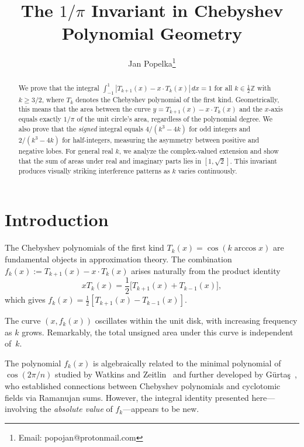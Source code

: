 \documentclass[11pt]{article}
\title{The $1/\pi$ Invariant in Chebyshev Polynomial Geometry}
\author{Jan Popelka\thanks{Email: popojan@protonmail.com}}
\date{}
\begin{document}
\maketitle

\begin{abstract}
We prove that the integral $\int_{-1}^{1} |T_{k+1}(x) - x \cdot T_k(x)| \, dx = 1$
for all $k \in \tfrac{1}{2}\mathbb{Z}$ with $k \geq 3/2$, where $T_k$ denotes the
Chebyshev polynomial of the first kind. Geometrically, this means that the area
between the curve $y = T_{k+1}(x) - x \cdot T_k(x)$ and the $x$-axis equals exactly
$1/\pi$ of the unit circle's area, regardless of the polynomial degree. We also
prove that the \emph{signed} integral equals $4/(k^3-4k)$ for odd integers and
$2/(k^3-4k)$ for half-integers, measuring the asymmetry between positive and
negative lobes. For general real $k$, we analyze the complex-valued extension
and show that the sum of areas under real and imaginary parts lies in $[1, \sqrt{2}]$.
This invariant produces visually striking interference patterns as $k$ varies continuously.
\end{abstract}

\section{Introduction}

The Chebyshev polynomials of the first kind $T_k(x) = \cos(k \arccos x)$ are
fundamental objects in approximation theory. The combination
$f_k(x) := T_{k+1}(x) - x \cdot T_k(x)$ arises naturally from the product identity
\cite{mason}
\begin{equation}
x T_k(x) = \frac{1}{2}\bigl[T_{k+1}(x) + T_{k-1}(x)\bigr],
\end{equation}
which gives $f_k(x) = \frac{1}{2}[T_{k+1}(x) - T_{k-1}(x)]$.

The curve $(x, f_k(x))$ oscillates within the unit disk, with increasing frequency
as $k$ grows. Remarkably, the total unsigned area under this curve is independent
of~$k$.

The polynomial $f_k(x)$ is algebraically related to the minimal polynomial of
$\cos(2\pi/n)$ studied by Watkins and Zeitlin~\cite{watkins1993} and further developed
by G\"urta\c{s}~\cite{gurtas2016}, who established connections between Chebyshev
polynomials and cyclotomic fields via Ramanujan sums. However, the integral
identity presented here---involving the \emph{absolute value} of $f_k$---appears
to be new.
\end{document}
